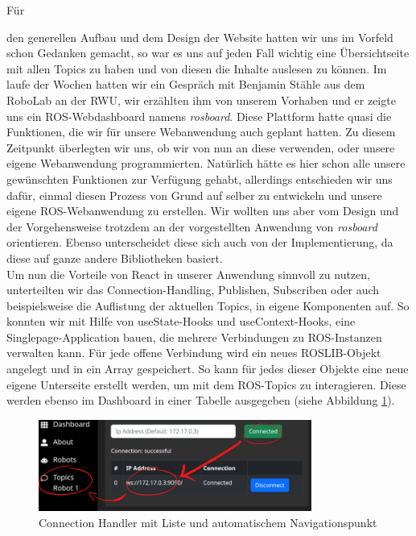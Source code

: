\begin{flushleft}
\hypertarget{rosboard-target}{Für} den generellen Aufbau und dem Design der Website hatten wir uns im Vorfeld schon Gedanken gemacht, so war es uns auf jeden Fall wichtig eine Übersichtseite mit allen Topics zu haben und von diesen die Inhalte auslesen zu können.
Im laufe der Wochen hatten wir ein Gespräch mit Benjamin Stähle aus dem RoboLab an der RWU, wir erzählten ihm von unserem Vorhaben und er zeigte uns ein ROS-Webdashboard namens \textit{rosboard}.
Diese Plattform hatte quasi die Funktionen, die wir für unsere Webanwendung auch geplant hatten.
Zu diesem Zeitpunkt überlegten wir uns, ob wir von nun an diese verwenden, oder unsere eigene Webanwendung programmierten.
Natürlich hätte es hier schon alle unsere gewünschten Funktionen zur Verfügung gehabt, allerdings entschieden wir uns dafür, einmal diesen Prozess von Grund auf selber zu entwickeln und unsere eigene ROS-Webanwendung zu erstellen.
Wir wollten uns aber vom Design und der Vorgehensweise trotzdem an der vorgestellten Anwendung von \textit{rosboard} orientieren.
Ebenso unterscheidet diese sich auch von der Implementierung, da diese auf ganze andere Bibliotheken basiert.
\\

\vspace{0.5cm}
Um nun die Vorteile von React in unserer Anwendung sinnvoll zu nutzen, unterteilten wir das Connection-Handling, Publishen, Subscriben oder auch beispielsweise die Auflistung der aktuellen Topics, in eigene Komponenten auf.
So konnten wir mit Hilfe von useState-Hooks und useContext-Hooks, eine Singlepage-Application bauen, die mehrere Verbindungen zu ROS-Instanzen verwalten kann.
Für jede offene Verbindung wird ein neues ROSLIB-Objekt angelegt und in ein Array gespeichert.
So kann für jedes dieser Objekte eine neue eigene Unterseite erstellt werden, um mit dem ROS-Topics zu interagieren. Diese werden ebenso im Dashboard in einer Tabelle ausgegeben (siehe Abbildung \ref{fig:ros_conn}).

\begin{figure}[h!]
    \centering
    \includegraphics[width=0.8\textwidth]{imgs/web/ros_conn.png}
    \caption{Connection Handler mit Liste und automatischem Navigationspunkt}
    \label{fig:ros_conn}%
\end{figure}


\end{flushleft}
